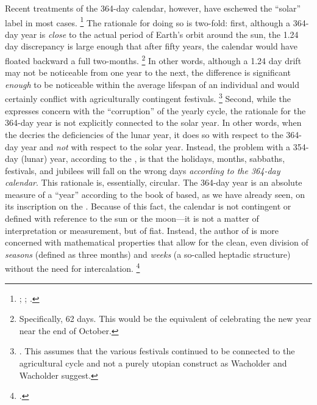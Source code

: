 Recent treatments of the 364-day calendar, however, have eschewed the ``solar'' label in most cases.%
    \footnote{%
        \cite[231]{glessmer_flint-vanderkam1999};
        \cite[80]{bendov_steele2011};
        \cite[438]{jacobus_brooke-hempel2018}.}
The rationale for doing so is two-fold: first, although a 364-day year is \emph{close} to the actual period of Earth's orbit around the sun, the 1.24 day discrepancy is large enough that after fifty years, the calendar would have floated backward a full two-months.%
    \footnote{%
        Specifically, 62 days. This would be the equivalent of celebrating the new year near the end of October.}
In other words, although a 1.24 day drift may not be noticeable from one year to the next, the difference is significant \emph{enough} to be noticeable within the average lifespan of an individual and would certainly conflict with agriculturally contingent festivals.%
    \footnote{%
        \Cite[28--37]{wacholder-wacholder_huca1995}. This assumes that the various festivals continued to be connected to the agricultural cycle and not a purely utopian construct as Wacholder and Wacholder suggest.}
Second, while the \ap expresses concern with the ``corruption'' of the yearly cycle, the rationale for the 364-day year is not explicitly connected to the solar year. In other words, when the \ap decries the deficiencies of the lunar year, it does so with respect to the 364-day year and \emph{not} with respect to the solar year. Instead, the problem with a 354-day (lunar) year, according to the \ap, is that the holidays, months, sabbaths, festivals, and jubilees will fall on the wrong days \emph{according to the 364-day calendar}. This rationale is, essentially, circular. The 364-day year is an absolute measure of a ``year'' according to the book of \jub based, as we have already seen, on its inscription on the \heavenlytablets. Because of this fact, the calendar is not contingent or defined with reference to the sun or the moon---it is not a matter of interpretation or measurement, but of fiat. Instead, the author of \jub is more concerned with mathematical properties that allow for the clean, even division of \emph{seasons} (defined as three months) and \emph{weeks} (a so-called heptadic structure) without the need for intercalation.%
    \footnote{%
        \Cite[125]{bendov-saulnier_cbr2008}.}

